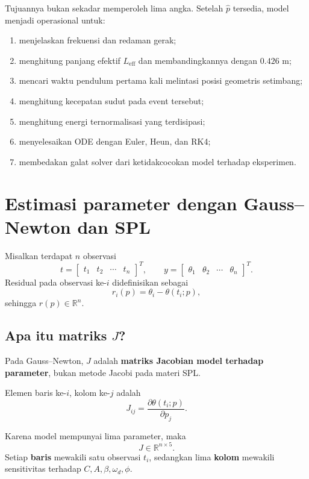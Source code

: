 \documentclass[book,english,noindex,lean,nobackpage,nocopyright,noupdate,nofiglist,notablist]{enacom}
\begin{document}
Tujuannya bukan sekadar memperoleh lima angka. Setelah $\hat p$ tersedia, model menjadi operasional untuk:
\begin{enumerate}
\item menjelaskan frekuensi dan redaman gerak;
\item menghitung panjang efektif $L_{\mathrm{eff}}$ dan membandingkannya dengan $0.426$ m;
\item mencari waktu pendulum pertama kali melintasi posisi geometris setimbang;
\item menghitung kecepatan sudut pada event tersebut;
\item menghitung energi ternormalisasi yang terdisipasi;
\item menyelesaikan ODE dengan Euler, Heun, dan RK4;
\item membedakan galat solver dari ketidakcocokan model terhadap eksperimen.
\end{enumerate}

\section{Estimasi parameter dengan Gauss--Newton dan SPL}
Misalkan terdapat $n$ observasi
\[
t=\begin{bmatrix}t_1&t_2&\cdots&t_n\end{bmatrix}^{T},\qquad
y=\begin{bmatrix}\theta_1&\theta_2&\cdots&\theta_n\end{bmatrix}^{T}.
\]
Residual pada observasi ke-$i$ didefinisikan sebagai
\begin{equation}
r_i(p)=\theta_i-\theta(t_i;p),
\end{equation}
sehingga $r(p)\in\mathbb{R}^{n}$.

\subsection{Apa itu matriks $J$?}
Pada Gauss--Newton, $J$ adalah \textbf{matriks Jacobian model terhadap parameter}, bukan metode Jacobi pada materi SPL.

Elemen baris ke-$i$, kolom ke-$j$ adalah
\begin{equation}
J_{ij}=\frac{\partial\theta(t_i;p)}{\partial p_j}.
\end{equation}

Karena model mempunyai lima parameter, maka
\[
J\in\mathbb{R}^{n\times5}.
\]
Setiap \textbf{baris} mewakili satu observasi $t_i$, sedangkan lima \textbf{kolom} mewakili sensitivitas terhadap $C,A,\beta,\omega_d,\phi$.
\end{document}
